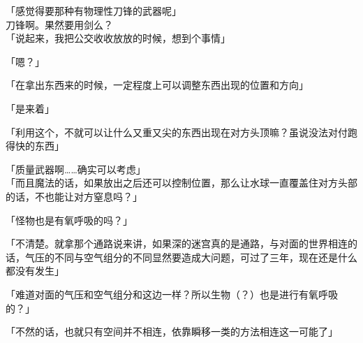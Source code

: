 「感觉得要那种有物理性刀锋的武器呢」\\

刀锋啊。果然要用剑么？\\

「说起来，我把公交收收放放的时候，想到个事情」

「嗯？」

「在拿出东西来的时候，一定程度上可以调整东西出现的位置和方向」

「是来着」

「利用这个，不就可以让什么又重又尖的东西出现在对方头顶嘛？虽说没法对付跑得快的东西」

「质量武器啊……确实可以考虑」\\

「而且魔法的话，如果放出之后还可以控制位置，那么让水球一直覆盖住对方头部的话，不也能让对方窒息吗？」

「怪物也是有氧呼吸的吗？」

「不清楚。就拿那个通路说来讲，如果深的迷宫真的是通路，与对面的世界相连的话，气压的不同与空气组分的不同显然要造成大问题，可过了三年，现在还是什么都没有发生」

「难道对面的气压和空气组分和这边一样？所以生物（？）也是进行有氧呼吸的？」

「不然的话，也就只有空间并不相连，依靠瞬移一类的方法相连这一可能了」\\

